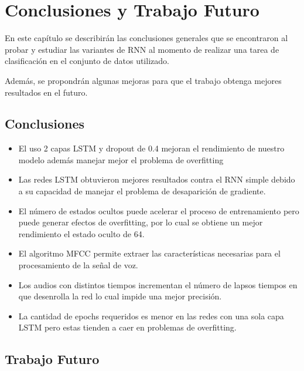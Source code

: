 \chapter{Conclusiones y Trabajo Futuro}
En este capítulo se describirán las conclusiones generales que se encontraron al probar y estudiar las variantes de RNN al momento de realizar una tarea de clasificación en el conjunto de datos utilizado.

Además, se propondrán algunas mejoras para que el trabajo obtenga mejores
resultados en el futuro.

\section{Conclusiones}

\begin{itemize}
	\item El uso 2 capas LSTM y dropout de 0.4 mejoran el rendimiento de nuestro modelo además manejar mejor el problema de overfitting
	\item Las redes LSTM obtuvieron mejores resultados contra el RNN simple debido a su capacidad de manejar el problema de desaparición de gradiente.
	\item El número de estados ocultos puede acelerar el proceso de entrenamiento pero puede generar efectos de overfitting, por lo cual se obtiene un mejor rendimiento el estado oculto de 64. 
	\item El algoritmo MFCC permite extraer las características necesarias para el procesamiento de la señal de voz.
	\item Los audios con distintos tiempos incrementan el número de lapsos tiempos en que desenrolla la red lo cual impide una mejor precisión.
	\item La cantidad de epochs requeridos es menor en las redes con una sola capa LSTM pero estas tienden a caer en problemas de overfitting.	
	
	
\end{itemize}

\section{Trabajo Futuro}

